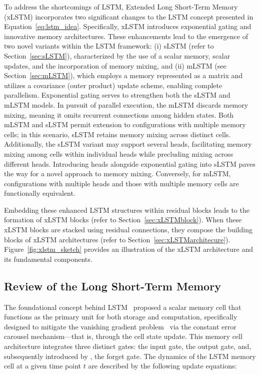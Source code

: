 To address the shortcomings of LSTM, Extended Long Short-Term Memory (xLSTM) incorporates two significant changes to the LSTM concept presented in Equation~\eqref{eq:lstm_idea}. Specifically, xLSTM introduces exponential gating and innovative memory architectures. These enhancements lead to the emergence of two novel variants within the LSTM framework: (i) sLSTM (refer to Section~\ref{sec:sLSTM}), characterized by the use of a scalar memory, scalar updates, and the incorporation of memory mixing, and (ii) mLSTM (see Section~\ref{sec:mLSTM}), which employs a memory represented as a matrix and utilizes a covariance (outer product) update scheme, enabling complete parallelism. Exponential gating serves to strengthen both the sLSTM and mLSTM models. In pursuit of parallel execution, the mLSTM discards memory mixing, meaning it omits recurrent connections among hidden states. Both mLSTM and sLSTM permit extension to configurations with multiple memory cells; in this scenario, sLSTM retains memory mixing across distinct cells. Additionally, the sLSTM variant may support several heads, facilitating memory mixing among cells within individual heads while precluding mixing across different heads. Introducing heads alongside exponential gating into sLSTM paves the way for a novel approach to memory mixing. Conversely, for mLSTM, configurations with multiple heads and those with multiple memory cells are functionally equivalent.

Embedding these enhanced LSTM structures within residual blocks leads to the formation of xLSTM blocks (refer to Section~\ref{sec:xLSTMblock}). When these xLSTM blocks are stacked using residual connections, they compose the building blocks of xLSTM architectures (refer to Section~\ref{sec:xLSTMarchitecure}). Figure~\ref{fig:xlstm_sketch} provides an illustration of the xLSTM architecture and its fundamental components.

\subsection{Review of the Long Short-Term Memory}
\label{sec:orgLSTM}

The foundational concept behind LSTM~\citep{Hochreiter:91,Hochreiter:97nips,Hochreiter:97} proposed a scalar memory cell that functions as the primary unit for both storage and computation, specifically designed to mitigate the vanishing gradient problem~\citep{Hochreiter:91,Hochreiter:00book} via the constant error carousel mechanism—that is, through the cell state update. This memory cell architecture integrates three distinct gates: the input gate, the output gate, and, subsequently introduced by \citet{Gers:00}, the forget gate.  
The dynamics of the LSTM memory cell at a given time point $t$ are described by the following update equations:

